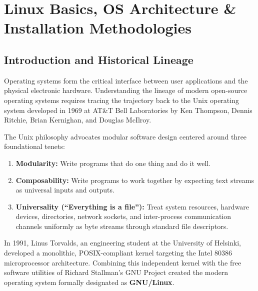 \chapter{Linux Basics, OS Architecture \& Installation Methodologies}
\label{chap:linux-basics}

\section{Introduction and Historical Lineage}
Operating systems form the critical interface between user applications and the physical electronic hardware. Understanding the lineage of modern open-source operating systems requires tracing the trajectory back to the Unix operating system developed in 1969 at AT\&T Bell Laboratories by Ken Thompson, Dennis Ritchie, Brian Kernighan, and Douglas McIlroy.

\begin{definition}
The Unix philosophy advocates modular software design centered around three foundational tenets:
\begin{enumerate}[leftmargin=1.5em]
    \item \textbf{Modularity:} Write programs that do one thing and do it well.
    \item \textbf{Composability:} Write programs to work together by expecting text streams as universal inputs and outputs.
    \item \textbf{Universality (``Everything is a file''):} Treat system resources, hardware devices, directories, network sockets, and inter-process communication channels uniformly as byte streams through standard file descriptors.
\end{enumerate}
\end{definition}

In 1991, Linus Torvalds, an engineering student at the University of Helsinki, developed a monolithic, POSIX-compliant kernel targeting the Intel 80386 microprocessor architecture. Combining this independent kernel with the free software utilities of Richard Stallman's GNU Project created the modern operating system formally designated as \textbf{GNU/Linux}.

